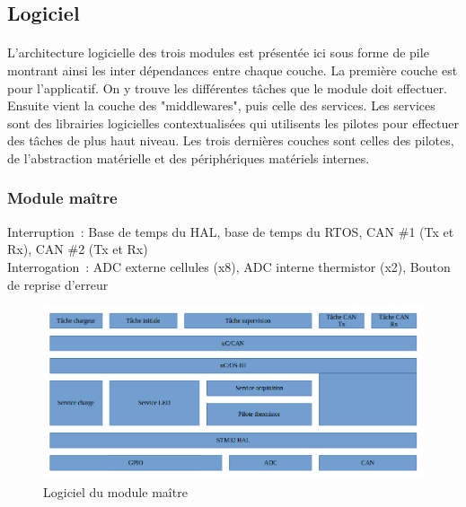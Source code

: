 \subsection{Logiciel}
	\paragraph*{}
	L'architecture logicielle des trois modules est présentée ici sous forme de pile montrant ainsi les inter dépendances entre chaque couche. La première couche est pour l'applicatif. On y trouve les différentes tâches que le module doit effectuer. Ensuite vient la couche des "middlewares", puis celle des services. Les services sont des librairies logicielles contextualisées qui utilisents les pilotes pour effectuer des tâches de plus haut niveau. Les trois dernières couches sont celles des pilotes, de l'abstraction matérielle et des périphériques matériels internes.
	\subsubsection{Module maître}
		\noindent
		Interruption : Base de temps du HAL, base de temps du RTOS, CAN \#1 (Tx et Rx),  CAN \#2 (Tx et Rx) \\
		Interrogation : ADC externe cellules (x8), ADC interne thermistor (x2), Bouton de reprise d’erreur
		\begin{figure}[H]
			\centering
			\includegraphics[scale=0.5]{Images/Logiciel_Master.png}
			\caption{Logiciel du module maître}
			\label{fig:logiciel_master}
		\end{figure}

